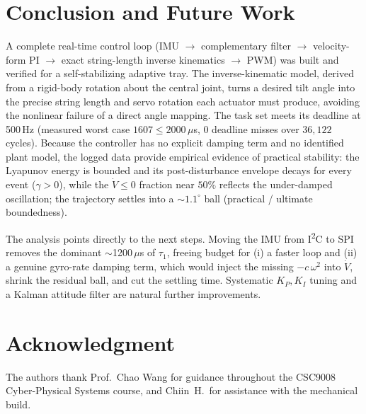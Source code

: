 \documentclass[conference]{IEEEtran}
\begin{document}
    \section{Conclusion and Future Work}
    A complete real-time control loop (IMU $\rightarrow$
    complementary filter $\rightarrow$ velocity-form PI $\rightarrow$ exact
    string-length inverse kinematics $\rightarrow$ PWM) was built and verified for a self-stabilizing
    adaptive tray. The inverse-kinematic model, derived from a rigid-body rotation
    about the central joint, turns a desired tilt angle into the precise string
    length and servo rotation each actuator must produce, avoiding the nonlinear
    failure of a direct angle mapping. The task set meets its deadline at
    500\,Hz (measured worst case $1607 \le 2000\,\mu$s, 0 deadline misses over
  $36{,}122$ cycles). Because the controller has no explicit damping term and no
    identified plant model, the logged data provide empirical evidence of
    practical stability: the
    Lyapunov energy is bounded and its post-disturbance envelope decays for every
    event ($\gamma>0$), while the $\dot V\le0$ fraction near $50\%$ reflects the
    under-damped oscillation; the trajectory settles into a
  $\sim\!1.1^\circ$ ball (practical / ultimate boundedness).

    The analysis points directly to the next steps. Moving the IMU from
    I\textsuperscript{2}C to SPI removes the dominant $\sim$1200\,$\mu$s of
  $\tau_1$, freeing budget for (i) a faster loop and (ii) a genuine gyro-rate
    damping term, which would inject the missing $-c\,\omega^2$ into $\dot V$,
    shrink the residual ball, and cut the settling time. Systematic $K_P,K_I$
tuning and a Kalman attitude filter are natural further improvements.

\section*{Acknowledgment}
The authors thank Prof.~Chao Wang for guidance throughout the CSC9008
Cyber-Physical Systems course, and Chiin~H.\ for assistance with the mechanical
build.



\end{document}
